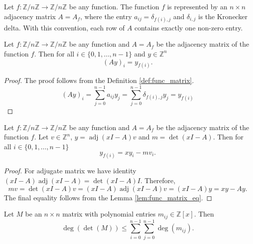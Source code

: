 \begin{definition}
\label{def:func_matrix}
\leanok
Let $f: \mathbb{Z}/n\mathbb{Z} \to \mathbb{Z}/n\mathbb{Z}$ be any function. The function $f$ is represented by an 
$n \times n$ adjacency matrix $A=A_f$, where the entry 
$a_{ij} = \delta_{f(i),j}$ 
and $\delta_{i,j}$ is the Kronecker delta.
With this convention, each row of $A$ contains exactly one non-zero entry.
\end{definition}

\begin{lemma}
\label{lem:func_matrix_eq}
\leanok
Let $f: \mathbb{Z}/n\mathbb{Z} \to \mathbb{Z}/n\mathbb{Z}$ be any function and $A=A_f$ be the adjacency matrix of the function $f$. 
Then for all $i\in \{0,1,\ldots,n-1\}$ and $y\in \mathbb{Z}^n$
$$(A y)_i = y_{f(i)}.$$
\end{lemma}

\begin{proof}
\leanok
The proof follows from the Definition \ref{def:func_matrix}.
$$(A y)_i = \sum_{j=0}^{n-1} a_{ij} y_j = \sum_{j=0}^{n-1} \delta_{f(i),j} y_j = y_{f(i)}$$
\end{proof}

\begin{lemma}
\label{lem:adj_eq}
\leanok
Let $f: \mathbb{Z}/n\mathbb{Z} \to \mathbb{Z}/n\mathbb{Z}$ be any function and $A=A_f$ be the adjacency matrix of the function $f$. 
Let $v\in \mathbb{Z}^n$, $y = \operatorname{adj}(x I - A) v$ and $m = \det(x I - A)$. Then for all $i\in \{0,1,\ldots,n-1\}$
$$y_{f(i)} = x y_i - m v_i.$$
\end{lemma}

\begin{proof}
\leanok
For adjugate matrix we have identity 
$(x I - A) \operatorname{adj} (x I - A) = \det(x I - A) I$.
Therefore,
$$m v = \det(x I - A) v = (x I - A) \operatorname{adj} (x I - A) v 
= (x I - A) y = x y - A y.$$
The final equality follows from the Lemma \ref{lem:func_matrix_eq}.
\end{proof}

\begin{lemma}
\label{lem:det_degree_le_sum_degrees}
\leanok
Let $M$ be an $n \times n$ matrix with polynomial entries $m_{ij} \in \mathbb{Z}[x]$.
Then 
$$\deg(\det(M)) \leq \sum_{i=0}^{n-1} \sum_{j=0}^{n-1} \deg(m_{ij}).$$
\end{lemma}

